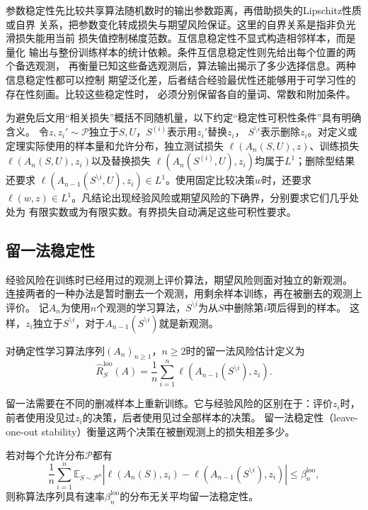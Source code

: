 参数稳定性先比较共享算法随机数时的输出参数距离，再借助损失的Lipschitz性质或自界
关系，把参数变化转成损失与期望风险保证。这里的自界关系是指非负光滑损失能用当前
损失值控制梯度范数。互信息稳定性不显式构造相邻样本，而是量化
输出与整份训练样本的统计依赖。条件互信息稳定性则先给出每个位置的两个备选观测，
再衡量已知这些备选观测后，算法输出揭示了多少选择信息。两种信息稳定性都可以控制
期望泛化差，后者结合经验最优性还能够用于可学习性的存在性刻画。比较这些稳定性时，
必须分别保留各自的量词、常数和附加条件。

为避免后文用“相关损失”概括不同随机量，以下约定“稳定性可积性条件”具有明确含义。
令$z,z_i'\sim\mathcal P$独立于$S,U$，$S^{(i)}$表示用$z_i'$替换$z_i$，
$S^{\setminus i}$表示删除$z_i$。对定义或定理实际使用的样本量和允许分布，独立测试损失
$\ell(A_n(S,U),z)$、训练损失$\ell(A_n(S,U),z_i)$以及替换损失
$\ell(A_n(S^{(i)},U),z_i)$均属于$L^1$；删除型结果还要求
$\ell(A_{n-1}(S^{\setminus i},U),z_i)\in L^1$。使用固定比较决策$w$时，还要求
$\ell(w,z)\in L^1$。凡结论出现经验风险或期望风险的下确界，分别要求它们几乎处处为
有限实数或为有限实数。有界损失自动满足这些可积性要求。

\subsection{留一法稳定性}

经验风险在训练时已经用过的观测上评价算法，期望风险则面对独立的新观测。
连接两者的一种办法是暂时删去一个观测，用剩余样本训练，再在被删去的观测上评价。
记$A_n$为使用$n$个观测的学习算法，$S^{\setminus i}$为从$S$中删除第$i$项后得到的样本。
这样，$z_i$独立于$S^{\setminus i}$，对于$A_{n-1}(S^{\setminus i})$就是新观测。

\begin{definition}[留一法风险估计]
\label{def:loo-risk}
对确定性学习算法序列$(A_n)_{n\geq1}$，$n\geq2$时的留一法风险估计定义为
\[
 \hat R_S^{\mathrm{loo}}(A)
 =\frac1n\sum_{i=1}^n\ell(A_{n-1}(S^{\setminus i}),z_i).
\]
\end{definition}

留一法需要在不同的删减样本上重新训练。它与经验风险的区别在于：评价$z_i$时，
前者使用没见过$z_i$的决策，后者使用见过全部样本的决策。
留一法稳定性（leave-one-out stability）衡量这两个决策在被删观测上的损失相差多少。

\begin{definition}[平均留一法稳定性]
\label{def:loo-stability}
若对每个允许分布$\mathcal P$都有
\[
 \frac1n\sum_{i=1}^n\mathbb E_{S\sim\mathcal P^n}
 \left|\ell(A_n(S),z_i)-\ell(A_{n-1}(S^{\setminus i}),z_i)\right|
 \leq\beta_n^{\mathrm{loo}},
\]
则称算法序列具有速率$\beta_n^{\mathrm{loo}}$的分布无关平均留一法稳定性。
\end{definition}

